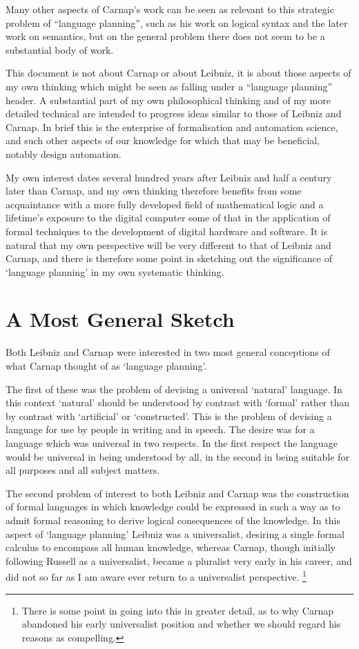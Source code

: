 \documentclass[numreferences]{rbjk}
\begin{document}
\begin{article}
Many other aspects of Carnap's work can be seen as relevant to this strategic problem of ``language planning'', such as his work on logical syntax and the later work on semantics, but on the general problem there does not seem to be a substantial body of work.

This document is not about Carnap or about Leibniz, it is about those aspects of my own thinking which might be seen as falling under a ``language planning'' header.
A substantial part of my own philosophical thinking and of my more detailed technical are intended to progress ideas similar to those of Leibniz and Carnap.
In brief this is the enterprise of formalisation and automation science, and such other aspects of our knowledge for which that may be beneficial, notably design automation.

My own interest dates several hundred years after Leibniz and half a century later than Carnap, and my own thinking therefore benefits from some acquaintance with a more fully developed field of mathematical logic and a lifetime's exposure to the digital computer some of that in the application of formal techniques to the development of digital hardware and software.
It is natural that my own perspective will be very different to that of Leibniz and Carnap, and there is therefore some point in sketching out the significance of `language planning' in my own systematic thinking.

\section{A Most General Sketch}

Both Leibniz and Carnap were interested in two most general conceptions of what Carnap thought of as `language planning'.

The first of these was the problem of devising a universal `natural' language.
In this context `natural' should be understood by contrast with `formal' rather than by contrast with `artificial' or `constructed'.
This is the problem of devising a language for use by people in writing and in speech.
The desire was for a language which was universal in two respects.
In the first respect the language would be universal in being understood by all, in the second in being suitable for all purposes and all subject matters.

The second problem of interest to both Leibniz and Carnap was the construction of formal languages in which knowledge could be expressed in such a way as to admit formal reasoning to derive logical consequences of the knowledge.
In this aspect of `language planning' Leibniz was a universalist, desiring a single formal calculus to encompass all human knowledge, whereas Carnap, though initially following Russell as a universalist, became a pluralist very early in his career, and did not so far as I am aware ever return to a universalist perspective.
\footnote{There is some point in going into this in greater detail, as to why Carnap abandoned his early universalist position and whether we should regard his reasons as compelling.}


\end{article}
\end{document}

